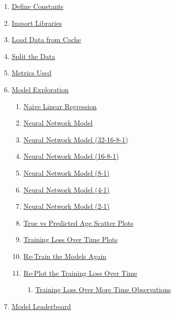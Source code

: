 \documentclass[11pt]{article}
\providecommand{\tightlist}{%
      \setlength{\itemsep}{0pt}\setlength{\parskip}{0pt}}
\begin{document}
\begin{enumerate}
\def\labelenumi{\arabic{enumi}.}
\tightlist
\item
  \hyperref[define-constants]{Define Constants}
\item
  \hyperref[import-libraries]{Import Libraries}
\item
  \hyperref[load-data-from-cache]{Load Data from Cache}
\item
  \hyperref[split-the-data]{Split the Data}
\item
  \hyperref[metrics-used]{Metrics Used}
\item
  \hyperref[model-exploration]{Model Exploration}

  \begin{enumerate}
  \def\labelenumii{\arabic{enumii}.}
  \tightlist
  \item
    \hyperref[naive-linear-regression]{Naive Linear Regression}
  \item
    \hyperref[neural-network-model]{Neural Network Model}
  \item
    \hyperref[neural-network-model-32-16-8-1]{Neural Network Model (32-16-8-1)}
  \item
    \hyperref[neural-network-model-16-8-1]{Neural Network Model (16-8-1)}
  \item
    \hyperref[neural-network-model-8-1]{Neural Network Model (8-1)}
  \item
    \hyperref[neural-network-model-4-1]{Neural Network Model (4-1)}
  \item
    \hyperref[neural-network-model-2-1]{Neural Network Model (2-1)}
  \item
    \hyperref[true-vs-predicted-age-scatter-plots]{True vs Predicted Age Scatter Plots}
  \item
    \hyperref[training-loss-over-time-plots]{Training Loss Over Time Plots}
  \item
    \hyperref[re-train-the-models-again]{Re-Train the Models Again}
  \item
    \hyperref[re-plot-the-training-loss-over-time]{Re-Plot the Training Loss Over Time}

    \begin{enumerate}
    \def\labelenumiii{\arabic{enumiii}.}
    \tightlist
    \item
      \hyperref[training-loss-over-more-time-observations]{Training Loss Over More Time Observations}
    \end{enumerate}
  \end{enumerate}
\item
  \hyperref[model-leaderboard]{Model Leaderboard}


\end{enumerate}
\end{document}
